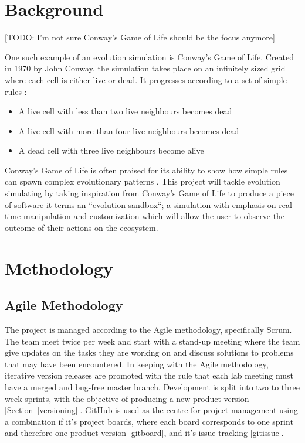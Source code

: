 \documentclass[a4paper, oneside, 11pt]{report}
\begin{document}
\chapter{Background}\label{background}
[TODO: I'm not sure Conway's Game of Life should be the focus anymore]

One such example of an evolution simulation is Conway's Game of Life. Created in 1970 by John Conway, the simulation takes place on an infinitely sized grid where each cell is either live or dead. It progresses according to a set of simple rules \cite{guardian}:
\begin{itemize}
	\item A live cell with less than two live neighbours becomes dead
	\item A live cell with more than four live neighbours becomes dead
	\item A dead cell with three live neighbours become alive
\end{itemize}

Conway's Game of Life is often praised for its ability to show how simple rules can spawn complex evolutionary patterns \cite{callahan}. This project will tackle evolution simulating by taking inspiration from Conway's Game of Life to produce a piece of software it terms an ``evolution sandbox``; a simulation with emphasis on real-time manipulation and customization which will allow the user to observe the outcome of their actions on the ecosystem.

\chapter{Methodology}\label{methodology}

\section{Agile Methodology}\label{projectmanagement}
The project is managed according to the Agile methodology, specifically Scrum. The team meet twice per week and start with a stand-up meeting where the team give updates on the tasks they are working on and discuss solutions to problems that may have been encountered. In keeping with the Agile methodology, iterative version releases are promoted with the rule that each lab meeting must have a merged and bug-free master branch. Development is split into two to three week sprints, with the objective of producing a new product version [Section~\ref{versioning}].
GitHub is used as the centre for project management using a combination if it's project boards, where each board corresponds to one sprint and therefore one product version \ref{gitboard}, and it's issue tracking \ref{gitissue}. 
\end{document}
